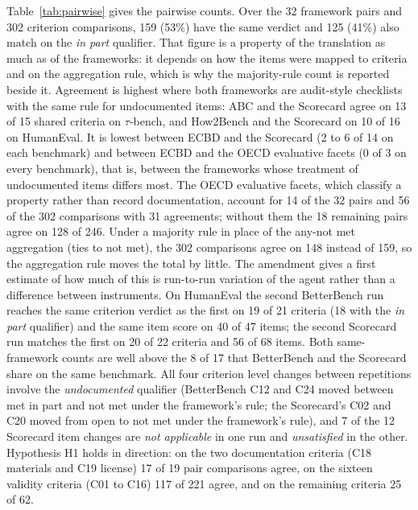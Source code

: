 \documentclass[10pt,conference]{IEEEtran}
\begin{document}
Table~\ref{tab:pairwise} gives the pairwise counts. Over the 32 framework pairs and 302 criterion comparisons, 159 (53\%) have the same verdict and 125 (41\%) also match on the \emph{in part} qualifier. That figure is a property of the translation as much as of the frameworks: it depends on how the items were mapped to criteria and on the aggregation rule, which is why the majority-rule count is reported beside it. Agreement is highest where both frameworks are audit-style checklists with the same rule for undocumented items: ABC and the Scorecard agree on 13 of 15 shared criteria on $\tau$-bench, and How2Bench and the Scorecard on 10 of 16 on HumanEval. It is lowest between ECBD and the Scorecard (2 to 6 of 14 on each benchmark) and between ECBD and the OECD evaluative facets (0 of 3 on every benchmark), that is, between the frameworks whose treatment of undocumented items differs most. The OECD evaluative facets, which classify a property rather than record documentation, account for 14 of the 32 pairs and 56 of the 302 comparisons with 31 agreements; without them the 18 remaining pairs agree on 128 of 246. Under a majority rule in place of the any-not met aggregation (ties to not met), the 302 comparisons agree on 148 instead of 159, so the aggregation rule moves the total by little. The amendment gives a first estimate of how much of this is run-to-run variation of the agent rather than a difference between instruments. On HumanEval the second BetterBench run reaches the same criterion verdict as the first on 19 of 21 criteria (18 with the \emph{in part} qualifier) and the same item score on 40 of 47 items; the second Scorecard run matches the first on 20 of 22 criteria and 56 of 68 items. Both same-framework counts are well above the 8 of 17 that BetterBench and the Scorecard share on the same benchmark. All four criterion level changes between repetitions involve the \emph{undocumented} qualifier (BetterBench C12 and C24 moved between met in part and not met under the framework's rule; the Scorecard's C02 and C20 moved from open to not met under the framework's rule), and 7 of the 12 Scorecard item changes are \emph{not applicable} in one run and \emph{unsatisfied} in the other. Hypothesis H1 holds in direction: on the two documentation criteria (C18 materials and C19 license) 17 of 19 pair comparisons agree, on the sixteen validity criteria (C01 to C16) 117 of 221 agree, and on the remaining criteria 25 of 62.
\end{document}
